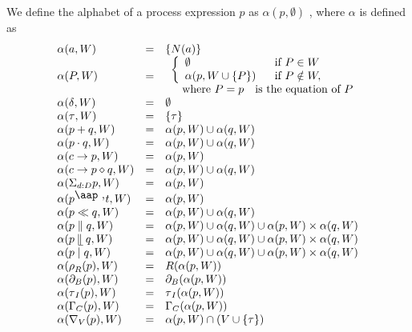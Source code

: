 \documentclass{article}
\begin{document}
We define the alphabet of a process expression $p$ as $\alpha (p,\emptyset )$%
, where $\alpha $ is defined as%
\[
\begin{array}{lll}
\alpha (a,W) & = & \{N(a)\} \\ 
\alpha (P,W) & = & 
\begin{array}{l}
\left\{ 
\begin{array}{ll}
\emptyset  & \text{if }P\in W \\ 
\alpha (p,W\cup \{P\}) & \text{if }P\notin W,%
\end{array}%
\right.  \\ 
\text{ where }P=p\text{ is the equation of }P%
\end{array}
\\ 
\alpha (\delta ,W) & = & \emptyset  \\ 
\alpha (\tau ,W) & = & \{\tau \} \\ 
\alpha (p+q,W) & = & \alpha (p,W)\cup \alpha (q,W) \\ 
\alpha (p\cdot q,W) & = & \alpha (p,W)\cup \alpha (q,W) \\ 
\alpha (c\rightarrow p,W) & = & \alpha (p,W) \\ 
\alpha (c\rightarrow p\diamond q,W) & = & \alpha (p,W)\cup \alpha (q,W) \\ 
\alpha (\Sigma _{d:D}p,W) & = & \alpha (p,W) \\ 
\alpha (p^{\mathbin{\mbox{\aap
,}}}t,W) & = & \alpha (p,W) \\ 
\alpha (p\ll q,W) & = & \alpha (p,W)\cup \alpha (q,W) \\ 
\alpha (p\parallel q,W) & = & \alpha (p,W)\cup \alpha (q,W)\cup \alpha
(p,W)\times \alpha (q,W) \\ 
\alpha (p\mathbin{\mathrel{\llfloor}}q,W) & = & \alpha (p,W)\cup \alpha
(q,W)\cup \alpha (p,W)\times \alpha (q,W) \\ 
\alpha (p\mid q,W) & = & \alpha (p,W)\cup \alpha (q,W)\cup \alpha
(p,W)\times \alpha (q,W) \\ 
\alpha (\rho _{R}(p),W) & = & R(\alpha (p,W)) \\ 
\alpha (\partial _{B}(p),W) & = & \partial _{B}(\alpha (p,W)) \\ 
\alpha (\tau _{I}(p),W) & = & \tau _{I}(\alpha (p,W)) \\ 
\alpha (\Gamma _{C}(p),W) & = & \Gamma _{C}(\alpha (p,W)) \\ 
\alpha (\nabla _{V}(p),W) & = & \alpha (p,W)\cap (V\cup \{\tau \})%
\end{array}%
\]
\end{document}
